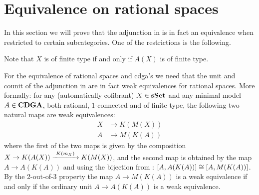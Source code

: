 \section{Equivalence on rational spaces}
In this section we will prove that the adjunction in  is in fact an equivalence when restricted to certain subcategories. One of the restrictions is the following.


Note that $X$ is of finite type if and only if $A(X)$ is of finite type.

For the equivalence of rational spaces and cdga's we need that the unit and counit of the adjunction in  are in fact weak equivalences for rational spaces. More formally: for any (automatically cofibrant) $X \in \mathbf{s{\mathbf{Set}}}$ and any minimal model $A \in \mathbf{CDGA}$, both rational, $1$-connected and of finite type, the following two natural maps are weak equivalences:
\begin{align*}
	X &\to K(M(X)) \\
	A &\to M(K(A))
\end{align*}
where the first of the two maps is given by the composition $X \to K(A(X)) \xrightarrow{\,\,{K(m_X)}\,\,} K(M(X))$,
and the second map is obtained by the map $A \to A(K(A))$ and using the bijection from : $[A, A(K(A))] \cong [A, M(K(A))]$. By the 2-out-of-3 property the map $A \to M(K(A))$ is a weak equivalence if and only if the ordinary unit $A \to A(K(A))$ is a weak equivalence.



